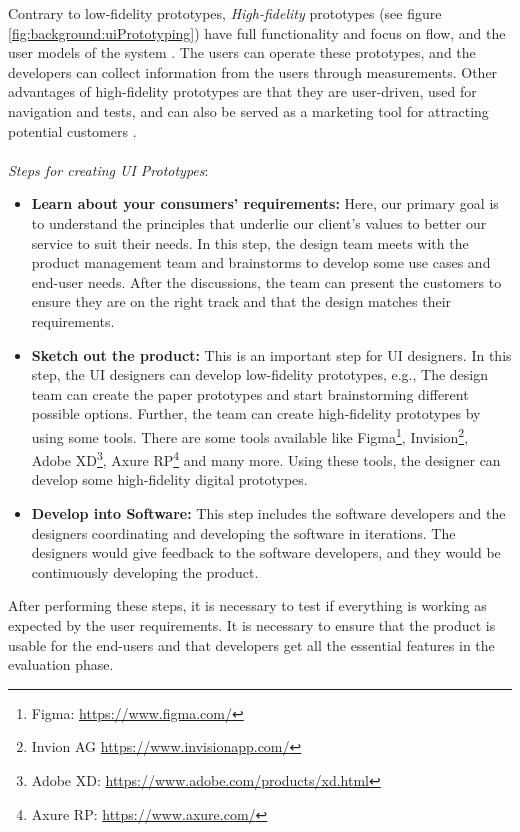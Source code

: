 Contrary to low-fidelity prototypes, \textit{High-fidelity} prototypes (see figure \ref{fig:background:uiPrototyping}) have full functionality and focus on flow, and the user models of the system \cite{article:prototyping:exploratory}.
The users can operate these prototypes, and the developers can collect information from the users through measurements. 
Other advantages of high-fidelity prototypes are that they are user-driven, used for navigation and tests, and can also be served as a marketing tool for attracting potential customers \cite{article:prototyping:highlowfidelity}.\\ \\
\textit{Steps for creating UI Prototypes}:
\begin{itemize}
  \item \textbf{Learn about your consumers' requirements:} Here, our primary goal is to understand the principles that underlie our client's values to better our service to suit their needs. In this step, the design team meets with the product management team and brainstorms to develop some use cases and end-user needs. After the discussions, the team can present the customers to ensure they are on the right track and that the design matches their requirements.
  \item \textbf{Sketch out the product:} This is an important step for UI designers. In this step, the UI designers can develop low-fidelity prototypes, e.g., The design team can create the paper prototypes and start brainstorming different possible options. Further, the team can create high-fidelity prototypes by using some tools. There are some tools available like Figma\footnote{Figma: \url{https://www.figma.com/}}, Invision\footnote{Invion AG \url{https://www.invisionapp.com/}}, Adobe XD\footnote{Adobe XD: \url{https://www.adobe.com/products/xd.html}}, Axure RP\footnote{Axure RP: \url{https://www.axure.com/}} and many more. Using these tools, the designer can develop some high-fidelity digital prototypes.
  \item \textbf{Develop into Software:} This step includes the software developers and the designers coordinating and developing the software in iterations. The designers would give feedback to the software developers, and they would be continuously developing the product.
\end{itemize}

After performing these steps, it is necessary to test if everything is working as expected by the user requirements.
It is necessary to ensure that the product is usable for the end-users and that developers get all the essential features in the evaluation phase. 
\clearpage
